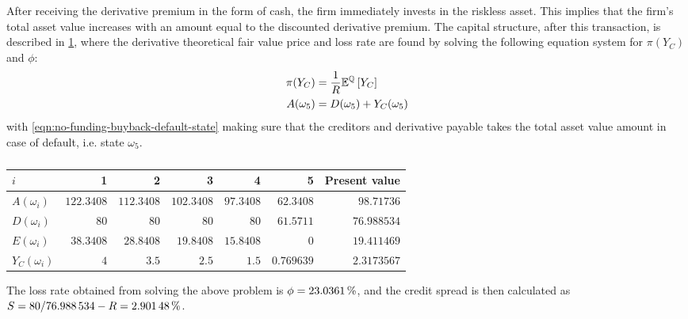 \documentclass[../main.tex]{subfiles}
\begin{document}
            After receiving the derivative premium in the form of cash, the firm immediately invests in the riskless asset. 
            This implies that the firm's total asset value increases with an amount equal to the discounted derivative premium. 
            The capital structure, after this transaction, is described in \cref{tbl:example-no-funding-buyback}, 
            where the derivative theoretical fair value price and loss rate are found
            by solving the following equation system for $\pi(Y_C)$ and $\phi$:
            \begin{align}
                \pi(Y_C) &= \frac{1}{R}\mathbb{E}^{\mathbb{Q}}\left[Y_{C}\right]
                \label{eqn:no-funding-buyback-derivative-fair-value}
                \\
                A(\omega_5) &= D(\omega_5) + Y_C(\omega_5)
                \label{eqn:no-funding-buyback-default-state}
            \end{align}
            with \cref{eqn:no-funding-buyback-default-state} making sure that the creditors and derivative payable
            takes the total asset value amount in case of default, i.e. state $\omega_5$.

            \begin{table}[H]
                \centering
                \begin{tabular}{l|rrrrr||r}
                    $i$ & 1 & 2 & 3 & 4 & 5 & Present value \\
                    \hline
                    $A(\omega_{i})$ & $\num{122.3408}$ & $\num{112.3408}$ & $\num{102.3408}$ & $\num{97.3408}$ & $\num{62.3408}$ & $\num{98.71736}$ \\
                    $D(\omega_{i})$ & $\num{80}$ & $\num{80}$ & $\num{80}$ & $\num{80}$ & $\num{61.5711}$ & $\num{76.988534}$ \\
                    $E(\omega_{i})$ & $38.3408$ & $\num{28.8408}$ & $\num{19.8408}$ & $\num{15.8408}$ & $\num{0}$ & $\num{19.411469}$ \\
                    $Y_C(\omega_{i})$ & $\num{4}$ & $\num{3.5}$ & $\num{2.5}$ & $\num{1.5}$ & $\num{0.769639}$ & $\num{2.3173567}$ \\
                \end{tabular}
                \caption{}
                \label{tbl:example-no-funding-buyback}
            \end{table}

            The loss rate obtained from solving the above problem is $\phi = \pct{0.230361}$, and the credit spread is then calculated as $S = \num{80}/\num{76.988534} - \grossrfrate = \pct{0.0290148}$.
\end{document}
